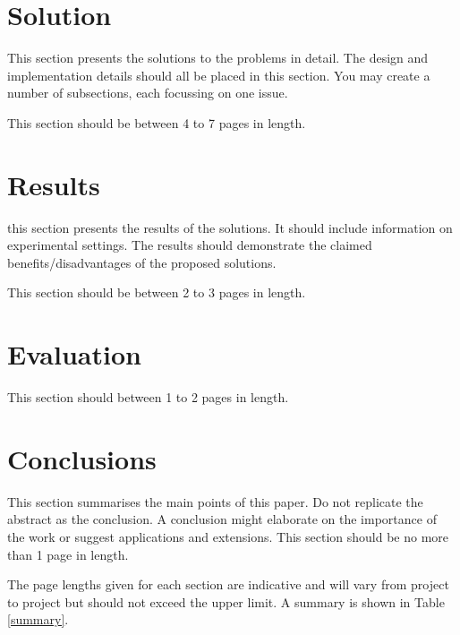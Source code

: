 \documentclass[12pt,a4paper]{article}
\begin{document}
\newpage

\section{Solution}

This section presents the solutions to the problems in detail.  The design and implementation details should all be placed in this section.  You may create a number of subsections, each focussing on one issue.

This section should be between 4 to 7 pages in length.

\section{Results}

this section presents the results of the solutions.  It should include information on experimental settings.  The results should demonstrate the claimed benefits/disadvantages of the proposed solutions.

This section should be between 2 to 3 pages in length.

\section{Evaluation}

This section should between 1 to 2 pages in length.

\section{Conclusions}

This section summarises the main points of this paper.  Do not replicate the abstract as the conclusion.  A conclusion might elaborate on the importance of the work or suggest applications and extensions.  This section should be no more than 1 page in length.

The page lengths given for each section are indicative and will vary from project to project but should not exceed the upper limit.  A summary is shown in Table \ref{summary}.
\end{document}

